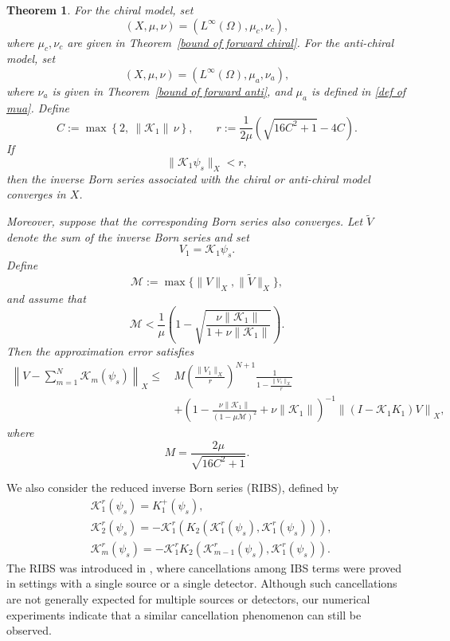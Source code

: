 \documentclass[12pt,reqno]{amsart}
\newtheorem{thm}{Theorem}[section]
\begin{document}
\begin{thm}\label{thm:ibs_convergence_error}
For the chiral model, set
\[
(X,\mu,\nu)=(L^{\infty}(\Omega),\mu_c,\nu_c),
\]
where $\mu_c,\nu_c$ are given in Theorem~\ref{bound of forward chiral}. For the
anti-chiral model, set
\[
(X,\mu,\nu)=(L^{\infty}(\Omega),\mu_a,\nu_a),
\]
where $\nu_a$ is given in Theorem~\ref{bound of forward anti}, and $\mu_a$ is
defined in \eqref{def of mua}. Define
\[
C := \max\left\{2,\ \|\mathcal{K}_1\|\,\nu\right\},
\qquad
r := \frac{1}{2\mu}\left(\sqrt{16C^2+1}-4C\right).
\]
If
\[
\|\mathcal{K}_1 \psi_s\|_{X} < r,
\]
then the inverse Born series associated with the chiral or anti-chiral model converges
in $X$.

Moreover, suppose that the corresponding Born series also converges. Let $\tilde{V}$
denote the sum of the inverse Born series and set
\[
V_1=\mathcal{K}_1\psi_s .
\]
Define
\[
\mathcal{M}:=\max\{\|V\|_X,\|\tilde{V}\|_X\},
\]
and assume that
\[
\mathcal{M}
<
\frac{1}{\mu}
\left(
1-\sqrt{\frac{\nu\|\mathcal{K}_1\|}{1+\nu\|\mathcal{K}_1\|}}
\right).
\]
Then the approximation error satisfies
\[
\begin{aligned}
\left\|V-\sum_{m=1}^N \mathcal{K}_m(\psi_s)\right\|_X
\leqslant\,
& M\left(\frac{\|V_1\|_X}{r}\right)^{N+1}
\frac{1}{1-\frac{\|V_1\|_X}{r}} \\
&+
\left(
1-\frac{\nu\|\mathcal{K}_1\|}{(1-\mu \mathcal{M})^2}
+\nu\|\mathcal{K}_1\|
\right)^{-1}
\left\|\left(I-\mathcal{K}_1 K_1\right)V\right\|_X,
\end{aligned}
\]
where
\[
M=\frac{2\mu}{\sqrt{16C^2+1}}.
\]
\end{thm}

We also consider the reduced inverse Born series (RIBS), defined by
\begin{align*}
& \mathcal{K}^r_1(\psi_s)=K_1^{+}(\psi_s), \\
& \mathcal{K}^r_2(\psi_s)=-\mathcal{K}^r_1\!\left(K_2\!\left(\mathcal{K}^r_1(\psi_s), \mathcal{K}^r_1(\psi_s)\right)\right), \\
& \mathcal{K}^r_m(\psi_s)= - \mathcal{K}^r_1 K_2\!\left(\mathcal{K}_{m-1}^r(\psi_s), \mathcal{K}^r_1(\psi_s)\right).
\end{align*}
The RIBS was introduced in \cite{2022reduced}, where cancellations among IBS terms were proved in settings with a single source or a single detector. Although such cancellations are not generally expected for multiple sources or detectors, our numerical experiments indicate that a similar cancellation phenomenon can still be observed.
\end{document}
